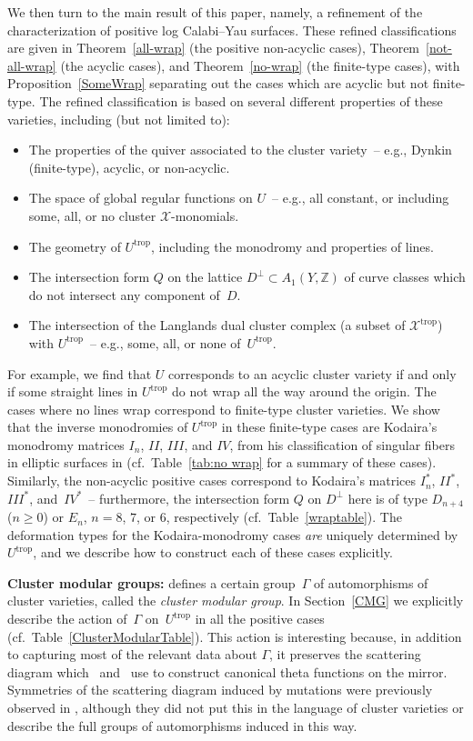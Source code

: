 \documentclass[pdftex]{sigma}
\numberwithin{equation}{section}
\numberwithin{figure}{section}
\numberwithin{table}{section}
\DeclareMathOperator{\trop}{trop}
\let\bb=\mathbb
\let\s=\mathcal
\theoremstyle{definition}
\begin{document}
We then turn to the main result of this paper, namely, a refinement of the characterization of positive log Calabi--Yau surfaces. These refined classifications are given in Theorem~\ref{all-wrap} (the positive non-acyclic cases), Theorem~\ref{not-all-wrap} (the acyclic cases), and Theorem~\ref{no-wrap} (the finite-type cases), with Proposition~\ref{SomeWrap} separating out the cases which are acyclic but not finite-type. The refined classification is based on several different properties of these varieties, including (but not limited to):
\begin{itemize}\itemsep=0pt
\item The properties of the quiver associated to the cluster variety~-- e.g., Dynkin (finite-type), acyclic, or non-acyclic.
\item The space of global regular functions on $U$~-- e.g., all constant, or including some, all, or no cluster $\s{X}$-monomials.
\item The geometry of $U^{\trop}$, including the monodromy and properties of lines.
\item The intersection form $Q$ on the lattice $D^{\perp}\subset A_1(Y,\bb{Z})$ of curve classes which do not intersect any component of~$D$.
\item The intersection of the Langlands dual cluster complex (a subset of $\s{X}^{\trop}$) with $U^{\trop}$~-- e.g., some, all, or none of~$U^{\trop}$.
\end{itemize}

For example, we find that $U$ corresponds to an acyclic cluster variety if and only if some straight lines in $U^{\trop}$ do not wrap all the way around the origin. The cases where no lines wrap correspond to finite-type cluster varieties. We show that the inverse monodromies of $U^{\trop}$ in these finite-type cases are Kodaira's monodromy matrices $I_n$, $II$, $III$, and $IV$, from his classification of singular fibers in elliptic surfaces in \cite{Kod} (cf.\ Table~\ref{tab:no wrap} for a summary of these cases). Similarly, the non-acyclic positive cases correspond to Kodaira's matrices $I_n^*$, $II^*$, $III^*$, and~$IV^*$~-- furthermore, the intersection form $Q$ on $D^{\perp}$ here is of type $D_{n+4}$ ($n\geq 0$) or $E_n$, $n=8$, $7$, or $6$, respectively (cf.\ Table~\ref{wraptable}). The deformation types for the Kodaira-monodromy cases {\it are} uniquely determined by $U^{\trop}$, and we describe how to construct each of these cases explicitly.

{\bf Cluster modular groups:} \cite{FG1} defines a certain group~$\Gamma$ of automorphisms of cluster varieties, called the {\it cluster modular group}. In Section~\ref{CMG} we explicitly describe the action of~$\Gamma$ on~$U^{\trop}$ in all the positive cases (cf.\ Table~\ref{ClusterModularTable}). This action is interesting because, in addition to capturing most of the relevant data about $\Gamma$, it preserves the scattering diagram which~\cite{GHK1} and~\cite{GHKK} use to construct canonical theta functions on the mirror. Symmetries of the scattering diagram induced by mutations were previously observed in \cite[Theorem~7]{GP}, although they did not put this in the language of cluster varieties or describe the full groups of automorphisms induced in this way.
\end{document}
